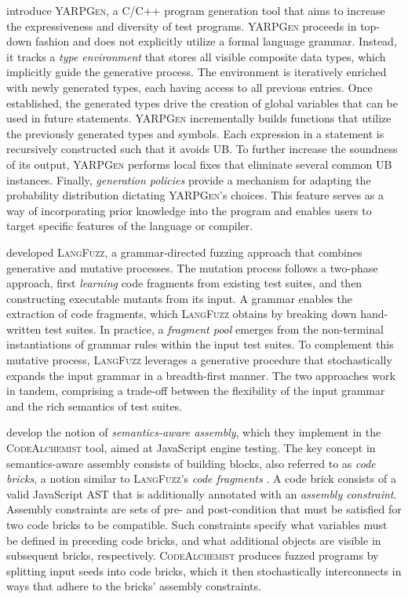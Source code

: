 \citet{livinskii2020random} introduce \textsc{YARPGen}, a C/C++ program generation
tool that aims to increase the expressiveness and diversity of test programs.
\textsc{YARPGen} proceeds in top-down fashion and does not explicitly utilize
a formal language grammar.
Instead, it tracks a \textit{type environment} that stores all visible composite
data types, which implicitly guide the generative process.
The environment is iteratively enriched with newly generated types,
each having access to all previous entries.
Once established, the generated types drive the creation of global variables
that can be used in future statements.
\textsc{YARPGen} incrementally builds functions that utilize 
the previously generated types and symbols.
Each expression in a statement is recursively constructed 
such that it avoids \Gls{UB}.
To further increase the soundness of its output, \textsc{YARPGen}
performs local fixes that eliminate several common \gls{UB} instances.
Finally, \textit{generation policies} provide a mechanism
for adapting the probability distribution dictating
\textsc{YARPGen}'s choices.
This feature serves as a way of incorporating prior knowledge into
the program and enables users to target specific features of the language
or compiler.

\citet{holler2012fuzzing} developed \textsc{LangFuzz}, a grammar-directed fuzzing
approach that combines generative and mutative processes.
The mutation process follows a two-phase approach, first \textit{learning}
code fragments from existing test suites, and then constructing executable
mutants from its input. 
A grammar enables the extraction of code fragments, which \textsc{LangFuzz}
obtains by breaking down hand-written test suites.
In practice, a \textit{fragment pool} emerges from the non-terminal
instantiations of grammar rules within the input test suites.
To complement this mutative process, \textsc{LangFuzz} leverages
a generative procedure that stochastically expands the input
grammar in a breadth-first manner.
The two approaches work in tandem, comprising a trade-off
between the flexibility of the input grammar and the
rich semantics of test suites.

\citet{han2019codealchemist} develop the notion of \textit{semantics-aware assembly},
which they implement in the \textsc{CodeAlchemist} tool, aimed at JavaScript
engine testing.
The key concept in semantics-aware assembly consists of building blocks,
also referred to as \textit{code bricks}, a notion similar to
\textsc{LangFuzz}'s \textit{code fragments} \cite{holler2012fuzzing}.
A code brick consists of a valid JavaScript \gls{AST} that is additionally
annotated with an \textit{assembly constraint}.
Assembly constraints are sets of pre- and post-condition
that must be satisfied for two code bricks to be compatible.
Such constraints specify what variables must be defined in
preceding code bricks, and what additional objects are
visible in subsequent bricks, respectively.
\textsc{CodeAlchemist} produces fuzzed programs by splitting
input seeds into code bricks, which it then stochastically
interconnects in ways that adhere to the bricks'
assembly constraints.

